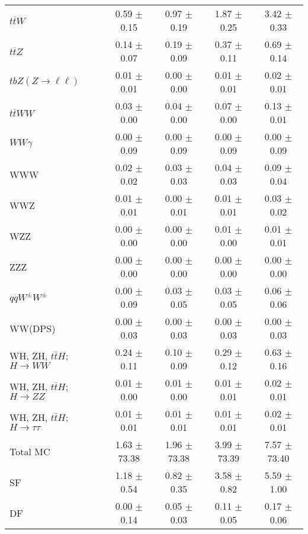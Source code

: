 \begin{tabular}{l|cccc}
                   $t\overline{t}W$ &  0.59 $\pm$  0.15 &  0.97 $\pm$  0.19 &  1.87 $\pm$  0.25 &  3.42 $\pm$  0.33 \\
                   $t\overline{t}Z$ &  0.14 $\pm$  0.07 &  0.19 $\pm$  0.09 &  0.37 $\pm$  0.11 &  0.69 $\pm$  0.14 \\
    $tbZ (Z \rightarrow \ell \ell)$ &  0.01 $\pm$  0.01 &  0.00 $\pm$  0.00 &  0.01 $\pm$  0.01 &  0.02 $\pm$  0.01 \\
                  $t\overline{t}WW$ &  0.03 $\pm$  0.00 &  0.04 $\pm$  0.00 &  0.07 $\pm$  0.00 &  0.13 $\pm$  0.01 \\
                         $WW\gamma$ &  0.00 $\pm$  0.09 &  0.00 $\pm$  0.09 &  0.00 $\pm$  0.09 &  0.00 $\pm$  0.09 \\
                                WWW &  0.02 $\pm$  0.02 &  0.03 $\pm$  0.03 &  0.04 $\pm$  0.03 &  0.09 $\pm$  0.04 \\
                                WWZ &  0.01 $\pm$  0.01 &  0.00 $\pm$  0.01 &  0.01 $\pm$  0.01 &  0.03 $\pm$  0.02 \\
                                WZZ &  0.00 $\pm$  0.00 &  0.00 $\pm$  0.00 &  0.01 $\pm$  0.00 &  0.01 $\pm$  0.01 \\
                                ZZZ &  0.00 $\pm$  0.00 &  0.00 $\pm$  0.00 &  0.00 $\pm$  0.00 &  0.00 $\pm$  0.00 \\
                 $qqW^{\pm}W^{\pm}$ &  0.00 $\pm$  0.09 &  0.03 $\pm$  0.05 &  0.03 $\pm$  0.05 &  0.06 $\pm$  0.06 \\
                            WW(DPS) &  0.00 $\pm$  0.03 &  0.00 $\pm$  0.03 &  0.00 $\pm$  0.03 &  0.00 $\pm$  0.03 \\
WH, ZH, $t\bar{t}H$; $H \rightarrow WW$ &  0.24 $\pm$  0.11 &  0.10 $\pm$  0.09 &  0.29 $\pm$  0.12 &  0.63 $\pm$  0.16 \\
WH, ZH, $t\bar{t}H$; $H \rightarrow ZZ$ &  0.01 $\pm$  0.00 &  0.01 $\pm$  0.00 &  0.01 $\pm$  0.01 &  0.02 $\pm$  0.01 \\
WH, ZH, $t\bar{t}H$; $H \rightarrow \tau\tau$ &  0.01 $\pm$  0.01 &  0.01 $\pm$  0.01 &  0.01 $\pm$  0.01 &  0.02 $\pm$  0.01 \\
\hline\hline
                           Total MC &  1.63 $\pm$ 73.38 &  1.96 $\pm$ 73.38 &  3.99 $\pm$ 73.39 &  7.57 $\pm$ 73.40 \\
\hline
                                 SF &  1.18 $\pm$  0.54 &  0.82 $\pm$  0.35 &  3.58 $\pm$  0.82 &  5.59 $\pm$  1.00 \\
                                 DF &  0.00 $\pm$  0.14 &  0.05 $\pm$  0.03 &  0.11 $\pm$  0.05 &  0.17 $\pm$  0.06 \\

\end{tabular}
